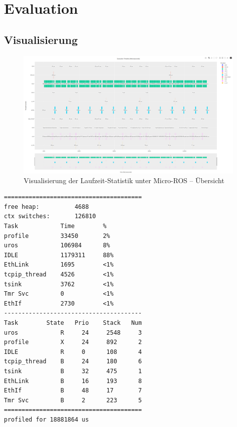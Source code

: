 \section{Evaluation}

\subsection{Visualisierung}

\begin{figure}[h]
    \centering
    \includegraphics[width=1\textwidth]{assets/micro_ros_profiling}
    \caption{Visualisierung der Laufzeit-Statistik unter Micro-ROS -- Übersicht}
    \label{fig:micro_ros_profiling}
\end{figure}

\begin{code}
\begin{verbatim}
=======================================
free heap:          4688
ctx switches:       126810
Task            Time        %
profile         33450       2%
uros            106984      8%
IDLE            1179311     88%
EthLink         1695        <1%
tcpip_thread    4526        <1%
tsink           3762        <1%
Tmr Svc         0           <1%
EthIf           2730        <1%
---------------------------------------
Task        State   Prio    Stack   Num
uros            R     24     2548     3
profile         X     24     892      2
IDLE            R     0      108      4
tcpip_thread    B     24     180      6
tsink           B     32     475      1
EthLink         B     16     193      8
EthIf           B     48     17       7
Tmr Svc         B     2      223      5
=======================================
profiled for 18881864 us
\end{verbatim}
    \label{code:freertos_summary_uros}
\end{code}

